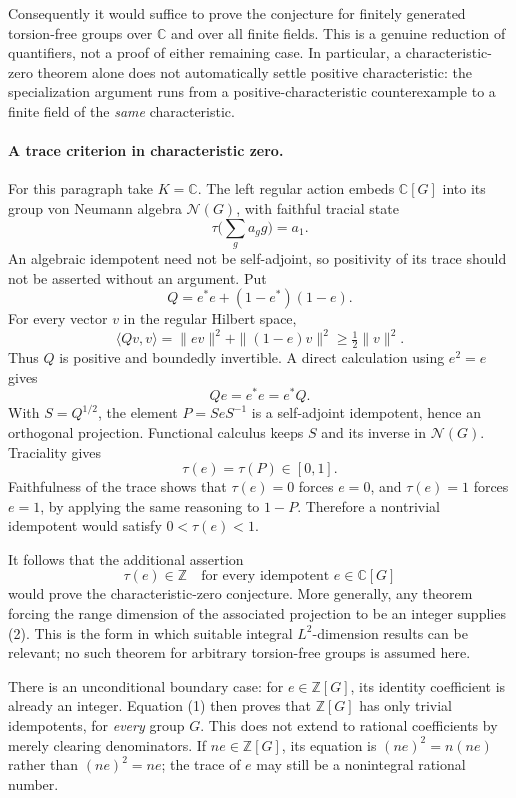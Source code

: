 \documentclass[11pt]{article}
\begin{document}
Consequently it would suffice to prove the conjecture for finitely generated torsion-free groups over $\mathbb C$ and over all finite fields. This is a genuine reduction of quantifiers, not a proof of either remaining case. In particular, a characteristic-zero theorem alone does not automatically settle positive characteristic: the specialization argument runs from a positive-characteristic counterexample to a finite field of the \emph{same} characteristic.

\paragraph{A trace criterion in characteristic zero.}
For this paragraph take $K=\mathbb C$. The left regular action embeds $\mathbb C[G]$ into its group von Neumann algebra $\mathcal N(G)$, with faithful tracial state
\[
 \tau\Big(\sum_g a_g g\Big)=a_1.
\]
An algebraic idempotent need not be self-adjoint, so positivity of its trace should not be asserted without an argument. Put
\[
 Q=e^*e+(1-e^*)(1-e).
\]
For every vector $v$ in the regular Hilbert space,
\[
 \langle Qv,v\rangle=\|ev\|^2+\|(1-e)v\|^2
 \ge\tfrac12\|v\|^2.
\]
Thus $Q$ is positive and boundedly invertible. A direct calculation using $e^2=e$ gives
\[
 Qe=e^*e=e^*Q.
\]
With $S=Q^{1/2}$, the element $P=SeS^{-1}$ is a self-adjoint idempotent, hence an orthogonal projection. Functional calculus keeps $S$ and its inverse in $\mathcal N(G)$. Traciality gives
\[
 \tau(e)=\tau(P)\in[0,1].                                  \tag{1}
\]
Faithfulness of the trace shows that $\tau(e)=0$ forces $e=0$, and $\tau(e)=1$ forces $e=1$, by applying the same reasoning to $1-P$. Therefore a nontrivial idempotent would satisfy $0<\tau(e)<1$.

It follows that the additional assertion
\[
 \tau(e)\in\mathbb Z\quad\text{for every idempotent }e\in\mathbb C[G]
                                                               \tag{2}
\]
would prove the characteristic-zero conjecture. More generally, any theorem forcing the range dimension of the associated projection to be an integer supplies (2). This is the form in which suitable integral $L^2$-dimension results can be relevant; no such theorem for arbitrary torsion-free groups is assumed here.

There is an unconditional boundary case: for $e\in\mathbb Z[G]$, its identity coefficient is already an integer. Equation (1) then proves that $\mathbb Z[G]$ has only trivial idempotents, for \emph{every} group $G$. This does not extend to rational coefficients by merely clearing denominators. If $ne\in\mathbb Z[G]$, its equation is $(ne)^2=n(ne)$ rather than $(ne)^2=ne$; the trace of $e$ may still be a nonintegral rational number.
\end{document}

